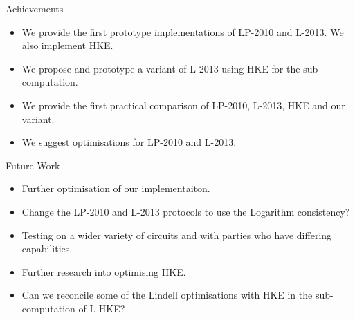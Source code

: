 \documentclass[t, 12pt]{beamer}            %
\begin{document}
\begin{frame}{Achievements}
	\begin{itemize} %
		\item We provide the first prototype implementations of LP-2010 and L-2013. We also implement HKE.
		\item We propose and prototype a variant of L-2013 using HKE for the sub-computation.
		\item We provide the first practical comparison of LP-2010, L-2013, HKE and our variant.
		\item We suggest optimisations for LP-2010 and L-2013.
		
	\end{itemize}
\end{frame}


\begin{frame}{Future Work}
	\begin{itemize} %
		\item Further optimisation of our implementaiton.
		\item Change the LP-2010 and L-2013  protocols to use the Logarithm consistency?
		\item Testing on a wider variety of circuits and with parties who have differing capabilities.
		\item Further research into optimising HKE.
		\item Can we reconcile some of the Lindell optimisations with HKE in the sub-computation of L-HKE? 
		
	\end{itemize}
\end{frame}
\end{document}
